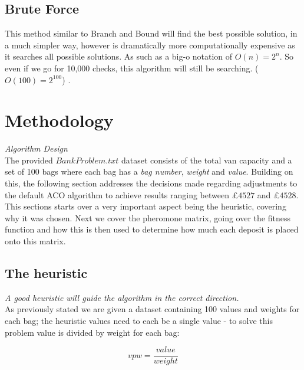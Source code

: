 \documentclass[11pt]{article}
\begin{document}
\subsection{Brute Force}

This method similar to Branch and Bound will find the best possible solution, in a much simpler way, however is dramatically more computationally expensive as it searches all possible solutions. As such as a big-o notation of $O(n) = 2^n$. So even if we go for 10,000 checks, this algorithm will still be searching. ($O(100) = 2^100$) \cite{hristakeva_shrestha_2005}.  
\section{Methodology}
\textit{Algorithm Design} \\ 

\vspace{-0.5em}
\noindent The provided $BankProblem.txt$ dataset consists of the total van capacity and a set of 100 bags where each bag has a \textit{bag number}, \textit{weight} and \textit{value}. Building on this, the following section addresses the decisions made regarding adjustments to the default ACO algorithm to achieve results ranging between £$4527$ and £$4528$. \\

\noindent This sections starts over a very important aspect being the heuristic, covering why it was chosen. Next we cover the pheromone matrix, going over the fitness function and how this is then used to determine how much each deposit is placed onto this matrix. 

\subsection{The heuristic}
\label{huristic-mat}
\textit{A good heuristic will guide the algorithm in the correct direction.} \\ 

\vspace{-0.5em}
\noindent As previously stated we are given a dataset containing 100 values and weights for each bag; the heuristic values need to each be a single value - to solve this problem value is divided by weight for each bag:  

\vspace{-0.3em}

$$
    vpw = \frac{value}{weight}
$$

\vspace{0.5em}
\end{document}
